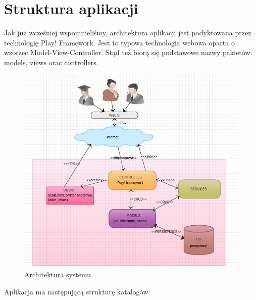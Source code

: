 \documentclass[a4paper,12pt,notitlepage]{mwrep}
\begin{document}
\section{Struktura aplikacji}
Jak już wcześniej wspomnieliśmy, architektura aplikacji jest podyktowana przez technologię Play! Framework. Jest to 
typowa technologia webowa oparta o wzorzec Model-View-Controller. Stąd też biorą się podstawowe nazwy pakietów: models, 
views orac controllers. \\
\begin{figure}[H]
\centering
\includegraphics[scale=0.5]{images/tasksArch.jpg}
\caption{Architektura systemu}
\label{fig:tasksArch}
\end{figure}

Aplikacja ma następującą strukturę katalogów:
\end{document}

